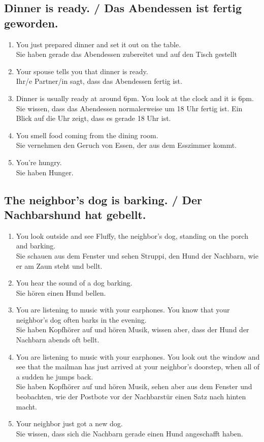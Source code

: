 \documentclass[11pt]{article}
\begin{document}
\subsection{Dinner is ready. / Das Abendessen ist fertig geworden.}

\begin{enumerate}
	\item You just prepared dinner and set it out on the table.\\
	Sie haben gerade das Abendessen zubereitet und auf den Tisch gestellt
	\item Your spouse tells you that dinner is ready.\\
	Ihr/e Partner/in sagt, dass das Abendessen fertig ist.
	\item Dinner is usually ready at around 6pm. You look at the clock and it is 6pm.\\
	Sie wissen, dass das Abendessen normalerweise um 18 Uhr fertig ist. Ein Blick auf die Uhr zeigt, dass es gerade 18 Uhr ist.
	\item You smell food coming from the dining room.\\
	Sie vernehmen den Geruch von Essen, der aus dem Esszimmer kommt.
	\item You're hungry.\\
	Sie haben Hunger.
\end{enumerate}

\subsection{The neighbor's dog is barking. / Der Nachbarshund hat gebellt.}

\begin{enumerate}
	\item You look outside and see Fluffy, the neighbor's dog, standing on the porch and barking.\\
	Sie schauen aus dem Fenster und sehen Struppi, den Hund der Nachbarn, wie er am Zaun steht und bellt.
	\item You hear the sound of a dog barking.\\
	Sie hören einen Hund bellen.
	\item You are listening to music with your earphones. You know that your neighbor's dog often barks in the evening.\\
	Sie haben Kopfhörer auf und hören Musik, wissen aber, dass der Hund der Nachbarn abends oft bellt.
	\item You are listening to music with your earphones. You look out the window and see that the mailman has just arrived at your neighbor's doorstep, when all of a sudden he jumps back.\\
	Sie haben Kopfhörer auf und hören Musik, sehen aber aus dem Fenster und beobachten, wie der Postbote vor der Nachbarstür einen Satz nach hinten macht.
	\item Your neighbor just got a new dog.\\
	Sie wissen, dass sich die Nachbarn gerade einen Hund angeschafft haben.
\end{enumerate}
\end{document}
